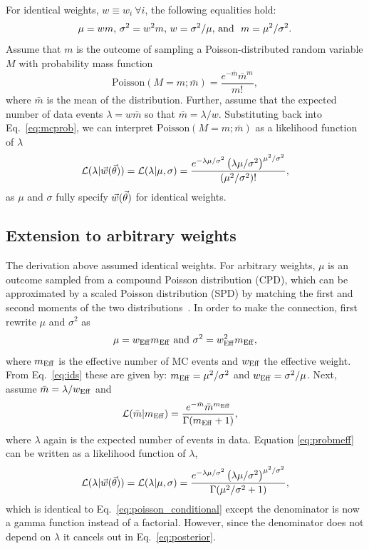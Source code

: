 For identical weights, $w \equiv w_i~\forall i$, the following equalities hold:
\begin{equation}\label{eq:ids}
\mu=wm \textmd{,}~ \sigma^2=w^2 m \textmd{,}~ w=\sigma^2/\mu \textmd{, and }~ m = \mu^2/\sigma^2.
\end{equation} 
Assume that $m$ is the outcome of sampling a Poisson-distributed random variable $M$ with probability mass function
\begin{equation}\label{eq:mcprob}
\mathrm{Poisson}(M=m;\bar m) = \frac{e^{-\bar m} {\bar m}^m}{m!},
\end{equation}
where $\bar m$ is the mean of the distribution. Further, assume that the expected number of data events $\lambda=w \bar m$ so that $\bar m = \lambda/w$. Substituting back into Eq.~\eqref{eq:mcprob}, we can interpret $\mathrm{Poisson}(M=m;\bar m)$ as a likelihood function of $\lambda$
\begin{equation}
\mathcal{L}(\lambda|\vec{w}(\vec{\theta}))=\mathcal{L}(\lambda|\mu, \sigma)=\frac{e^{-\lambda\mu/\sigma^2}\left(\lambda\mu/\sigma^2\right)^{\mu^2/\sigma^2}}{(\mu^2/\sigma^2)!},
\label{eq:poisson_conditional}
\end{equation}
as $\mu$ and $\sigma$ fully specify $\vec{w}(\vec{\theta})$ for identical weights. 

\subsection{Extension to arbitrary weights\label{sec:extending}}
The derivation above assumed identical weights. For arbitrary weights, $\mu$ is an outcome sampled from a compound Poisson distribution (CPD), which can be approximated by a scaled Poisson distribution (SPD) by matching the first and second moments of the two distributions~\cite{Bohm:2013gla}. In order to make the connection, first rewrite $\mu$ and $\sigma^2$ as
\begin{equation}\label{eq:effparameters}
\mu= w_\mathrm{Eff} m_\mathrm{Eff}~\textmd{and}~\sigma^2 = w_\mathrm{Eff}^2 m_\mathrm{Eff},
\end{equation}
where $m_\mathrm{Eff}$ is the effective number of MC events and $w_\mathrm{Eff}$ the effective weight. From Eq.~\eqref{eq:ids} these are given by: $m_\mathrm{Eff} = \mu^2/\sigma^2$ and $w_\mathrm{Eff}=\sigma^2/\mu$. Next, assume $\bar m = \lambda/w_\mathrm{Eff}$ and
\begin{align}
\label{eq:probmeff}
\mathcal{L}(\bar m|m_\mathrm{Eff})&= \frac{e^{-\bar m}{\bar m}^{m_\mathrm{Eff}}}{\Gamma(m_\mathrm{Eff}+1)},
\end{align}
where $\lambda$ again is the expected number of events in data. Equation \eqref{eq:probmeff} can be written as a likelihood function of $\lambda$,
\begin{equation}
\mathcal{L}(\lambda|\vec{w}(\vec{\theta}))=\mathcal{L}(\lambda|\mu, \sigma)=\frac{e^{-\lambda\mu/\sigma^2}\left(\lambda\mu/\sigma^2\right)^{\mu^2/\sigma^2}}{\Gamma(\mu^2/\sigma^2+1)},
\label{eq:poisson_conditional_arb}
\end{equation}
which is identical to Eq.~\eqref{eq:poisson_conditional} except the denominator is now a gamma function instead of a factorial. However, since the denominator does not depend on $\lambda$ it cancels out in Eq.~\eqref{eq:posterior}.

